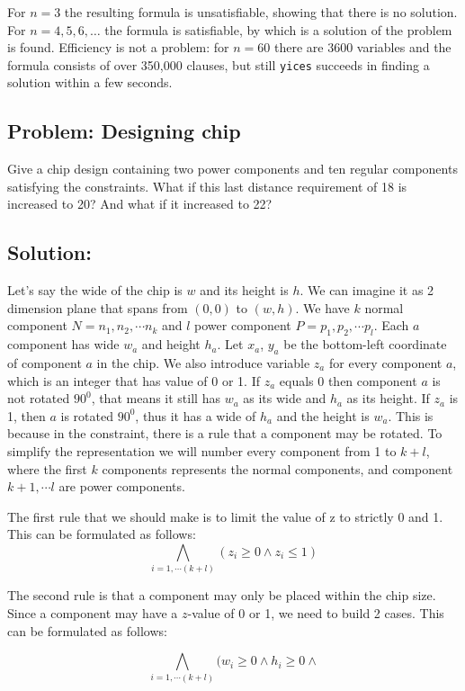 \documentclass[12pt]{article}
\begin{document}
For $n=3$ the resulting formula is unsatisfiable, showing that
there is no solution. For $n = 4,5,6,\ldots$ the formula is
satisfiable, by which is a solution of the problem is found.
Efficiency is not a problem: for $n = 60$ there are 3600
variables and the formula consists of over 350,000 clauses, but 
still {\tt yices} succeeds in finding a solution within a few
seconds.

\subsection*{Problem: Designing chip}
Give a chip design containing two power components and ten
regular components satisfying the constraints. What if this last distance requirement of 18 is increased to 20? And what if it increased to 22? 

\subsection*{Solution:}
Let's say the wide of the chip is $w$ and its height is $h$. We can imagine it as 2 dimension plane that spans from $(0,0)$ to $(w,h)$. We have $k$ normal component $N=n_1, n_2, \cdots n_k$ and $l$ power component $P=p_1, p_2, \cdots p_l$. Each $a$ component has wide $w_a$ and height $h_a$. Let $x_a$, $y_a$ be the bottom-left coordinate of component $a$ in the chip. We also introduce variable $z_a$ for every component $a$, which is an integer that has value of 0 or 1. If $z_a$ equals 0 then component $a$ is not rotated $90^0$, that means it still has $w_a$ as its wide and $h_a$ as its height. If $z_a$ is 1, then $a$ is rotated $90^0$, thus it has a wide of $h_a$ and the height is $w_a$. This is because in the constraint, there is a rule that a component may be rotated. To simplify the representation we will number every component from 1 to $k+l$, where the first $k$ components represents the normal components, and component $k+1, \cdots l$ are power components.

The first rule that we should make is to limit the value of z to strictly 0 and 1. This can be formulated as follows:
\[ \bigwedge_{i=1,\cdots (k+l)} {(z_i \geq 0 \wedge z_i \leq 1)} \]

The second rule is that a component may only be placed within the chip size. Since a component may have a $z$-value of 0 or 1, we need to build 2 cases. This can be formulated as follows: 

\[ \bigwedge_{i=1,\cdots (k+l)} {\Bigg(w_i \geq 0 \wedge h_i \geq 0 \wedge } \]
	
\end{document}
